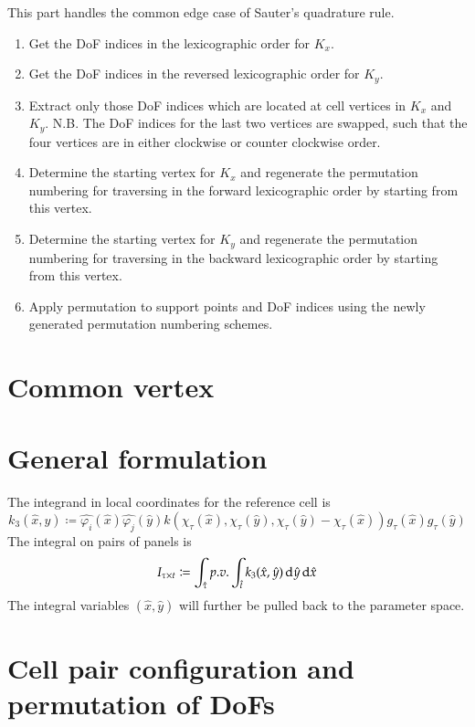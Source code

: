 \documentclass[11pt, a4paper]{book}
\begin{document}
This part handles the common edge case of Sauter's quadrature rule.
\begin{enumerate}
\item Get the DoF indices in the lexicographic order for $K_x$.
\item Get the DoF indices in the reversed lexicographic order for $K_y$.
\item Extract only those DoF indices which are located at cell vertices in $K_x$ and $K_y$.
  N.B. The DoF indices for the last two vertices are swapped, such that the four vertices are in
  either clockwise or counter clockwise order.
\item Determine the starting vertex for $K_x$ and regenerate the permutation numbering for
  traversing in the forward lexicographic order by starting from this vertex.
\item Determine the starting vertex for $K_y$ and regenerate the permutation numbering for
  traversing in the backward lexicographic order by starting from this vertex.
\item Apply permutation to support points and DoF indices using the newly generated permutation
  numbering schemes.
\end{enumerate}


\section{Common vertex}

\section{General formulation}

The integrand in local coordinates for the reference cell is
\begin{equation}
  k_3(\hat{x}, \hat{y}) \coloneqq \hat{\varphi_i}(\hat{x})\hat{\varphi_j}(\hat{y})
  k(\chi_{\tau}(\hat{x}), \chi_{\tau}(\hat{y}), \chi_{\tau}(\hat{y}) 
  - \chi_{\tau}(\hat{x})) g_{\tau}(\hat{x}) g_{\tau}(\hat{y})
\end{equation}
The integral on pairs of panels is
\begin{equation}
  I_{\tau\times t} \coloneqq \int_{\hat{\tau}} p.v. \int_{\hat{t}} k_3(\hat{x},\hat{y}) \,\mathrm{d}
  \hat{y} \,\mathrm{d} \hat{x}
\end{equation}
The integral variables $(\hat{x}, \hat{y})$ will further be pulled back to the parameter space.

\section{Cell pair configuration and permutation of DoFs}
\end{document}
